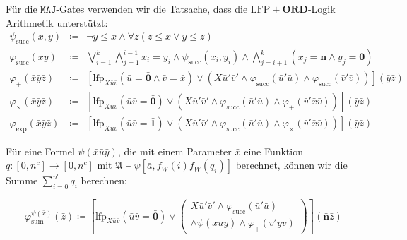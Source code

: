 Für die $\mathtt{MAJ}$-Gates verwenden wir die Tatsache, dass die
$\mathrm{LFP}+\mathbf{ORD}$-Logik Arithmetik unterstützt:
\begin{eqnarray*}
\psi_{\mathrm{succ}}\left(x,y\right) & \coloneqq & \neg y\leqslant x\wedge\forall z\left(z\leqslant x\vee y\leqslant z\right)\\
\varphi_{\mathrm{succ}}\left(\bar{x}\bar{y}\right) & \coloneqq & \bigvee_{i=1}^{k}\bigwedge_{j=1}^{i-1}x_{i}=y_{i}\wedge\psi_{\mathrm{succ}}\left(x_{i},y_{i}\right)\wedge\bigwedge_{j=i+1}^{k}\left(x_{j}=\mathbf{n}\wedge y_{j}=\mathbf{0}\right)\\
\varphi_{+}\left(\bar{x}\bar{y}\bar{z}\right) & \coloneqq & \left[\mathrm{lfp}_{X\bar{u}\bar{v}}\left(\bar{u}=\bar{\mathbf{0}}\wedge\bar{v}=\bar{x}\right)\vee\left(X\bar{u}'\bar{v}'\wedge\varphi_{\mathrm{succ}}\left(\bar{u}'\bar{u}\right)\wedge\varphi_{\mathrm{succ}}\left(\bar{v}'\bar{v}\right)\right)\right]\left(\bar{y}\bar{z}\right)\\
\varphi_{\times}\left(\bar{x}\bar{y}\bar{z}\right) & \coloneqq & \left[\mathrm{lfp}_{X\bar{u}\bar{v}}\left(\bar{u}\bar{v}=\bar{\mathbf{0}}\right)\vee\left(X\bar{u}'\bar{v}'\wedge\varphi_{\mathrm{succ}}\left(\bar{u}'\bar{u}\right)\wedge\varphi_{+}\left(\bar{v}'\bar{x}\bar{v}\right)\right)\right]\left(\bar{y}\bar{z}\right)\\
\varphi_{\exp}\left(\bar{x}\bar{y}\bar{z}\right) & \coloneqq & \left[\mathrm{lfp}_{X\bar{u}\bar{v}}\left(\bar{u}\bar{v}=\bar{\mathbf{1}}\right)\vee\left(X\bar{u}'\bar{v}'\wedge\varphi_{\mathrm{succ}}\left(\bar{u}'\bar{u}\right)\wedge\varphi_{\times}\left(\bar{v}'\bar{x}\bar{v}\right)\right)\right]\left(\bar{y}\bar{z}\right)
\end{eqnarray*}

Für eine Formel $\psi\left(\bar{x}\bar{u}\bar{y}\right)$, die mit
einem Parameter $\bar{x}$ eine Funktion $q:\left[0,n^{c}\right]\rightarrow\left[0,n^{c}\right]$
mit $\mathfrak{A}\models\psi\left[\bar{a},f_{W}\left(i\right)f_{W}\left(q_{i}\right)\right]$
berechnet, können wir die Summe $\sum_{i=0}^{n^{c}}q_{i}$ berechnen:

\[
\varphi_{\mathrm{sum}}^{\psi\left(\bar{x}\right)}\left(\bar{z}\right)\coloneqq\left[\mathrm{lfp}_{X\bar{u}\bar{v}}\left(\bar{u}\bar{v}=\bar{\mathbf{0}}\right)\vee\left(\begin{array}{c}
X\bar{u}'\bar{v}'\wedge\varphi_{\mathrm{succ}}\left(\bar{u}'\bar{u}\right)\\
\wedge\psi\left(\bar{x}\bar{u}\bar{y}\right)\wedge\varphi_{+}\left(\bar{v}'\bar{y}\bar{v}\right)
\end{array}\right)\right]\left(\bar{\mathbf{n}}\bar{z}\right)
\]

